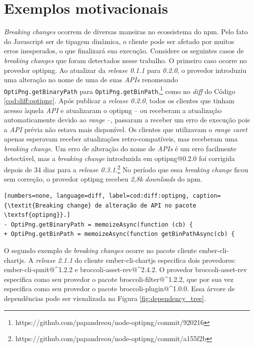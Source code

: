 \chapter{Exemplos motivacionais}
\label{cap:exemplos}

\textit{Breaking changes} ocorrem de diversas maneiras no ecossistema do \textsf{npm}. Pelo fato do \textsf{Javascript} ser de tipagem dinâmica, o cliente pode ser afetado por muitos erros inesperados, o que finalizará sua execução. Considere os seguintes casos de \textit{breaking changes} que foram detectados nesse trabalho. O primeiro caso ocorre no provedor \textsf{optipng}. Ao atualizar da \textit{release 0.1.1} para \textit{0.2.0}, o provedor introduziu uma alteração no nome de uma de suas \textit{APIs} renomeando \texttt{OptiPng.getBinaryPath} para \texttt{OptiPng.getBinPath},\footnote{https://github.com/papandreou/node-optipng/commit/920216} como no \textit{diff} do Código \ref{cod:diff:optipng}. Após publicar a \textit{release 0.2.0}, todos os clientes que tinham acesso àquela \textit{API} e atualizaram o \textsf{optipng} -- ou receberam a atualização automaticamente devido ao \textit{range} --, passaram a receber um erro de execução pois a \textit{API} prévia não estava mais disponível. Os clientes que utilizavam o \textit{range caret} apenas esperavam receber atualizações retro-compatíveis, mas receberam uma \textit{breaking change}. Um erro de alteração do nome de \textit{APIs} é um erro facilmente detectável, mas a \textit{breaking change} introduzida em \textsf{optipng@0.2.0} foi corrigida depois de 34 dias para a \textit{release 0.3.1}.\footnote{https://github.com/papandreou/node-optipng/commit/a155f2b} No período que essa \textit{breaking change} ficou sem correção, o provedor \textsf{optipng} recebeu \textit{2,8k} \textit{downloads} do \textsf{npm}.

\begin{lstlisting}[numbers=none, language=diff, label=cod:diff:optipng, caption={\textit{Breaking change} de alteração de API no pacote \textsf{optipng}}.]
- OptiPng.getBinaryPath = memoizeAsync(function (cb) {
+ OptiPng.getBinPath = memoizeAsync(function getBinPathAsync(cb) {
\end{lstlisting}

O segundo exemplo de \textit{breaking changes} ocorre no pacote cliente \textsf{ember-cli-chartjs}. A \textit{release 2.1.1} do cliente \textsf{ember-cli-chartjs} especifica dois provedores: \textsf{ember-cli-qunit@\textasciicircum1.2.2} e \textsf{broccoli-asset-rev@\textasciicircum2.4.2}. O provedor \textsf{broccoli-asset-rev} especifica como seu provedor o pacote \textsf{broccoli-filter@\textasciicircum1.2.2}, que por sua vez especifica como seu provedor o pacote \textsf{broccoli-plugin@\textasciicircum1.0.0}. Essa árvore de dependências pode ser visualizada na Figura \ref{fig:dependency_tree}.

